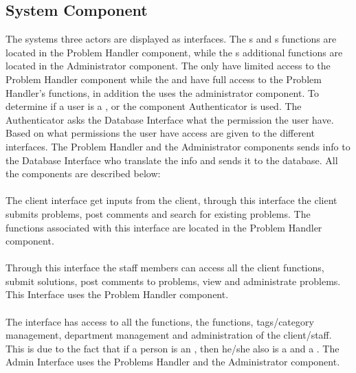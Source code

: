 \subsection{System Component}
\label{sub:SystemComponent}
The systems three actors are displayed as interfaces. The \aclient s and \astaff s functions are located in the Problem Handler component, while the \admin s additional functions are located in the Administrator component. The \aclient[] only have limited access to the Problem Handler component while the \astaff[] and \admin[] have full access to the Problem Handler's functions, in addition the \admin[] uses the administrator component. To determine if a user is a \aclient[], \astaff[] or \admin[] the component Authenticator is used. The Authenticator asks the Database Interface what the permission the user have. Based on what permissions the user have access are given to the different interfaces. The Problem Handler and the Administrator components sends info to the Database Interface who translate the info and sends it to the database. All the components are described below:

\paragraph{\cinterface}
The client interface get inputs from the client, through this interface the client submits problems, post comments and search for existing problems.
The functions associated with this interface are located in the Problem Handler component.  

\paragraph{\sinterface}
Through this interface the staff members can access all the client functions, submit solutions, post comments to \open[] problems, view \worklist[] and administrate problems.
This Interface uses the Problem Handler component. 

\paragraph{\ainterface}  
The interface has access to all the \aclient[] functions, the \astaff[] functions, tags/category management, department management and administration of the client/staff. This is due to the fact that if a person is an \admin[], then he/she also is a \astaff[] and a \aclient[]. The Admin Interface uses the Problems Handler and the Administrator component. 

